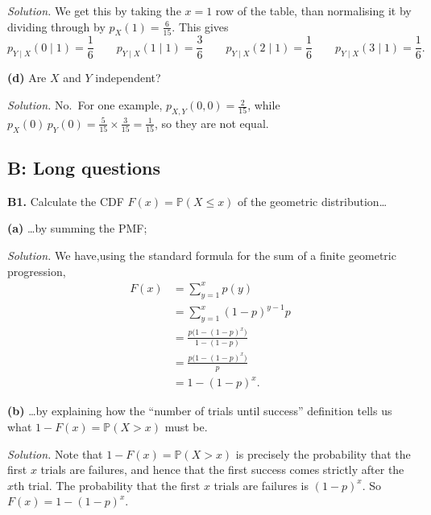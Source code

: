 \documentclass[
  a4paper,
]{book}
\theoremstyle{definition}
\theoremstyle{definition}
\theoremstyle{definition}
\theoremstyle{definition}
\theoremstyle{remark}
\begin{document}
\begin{myanswers}
\emph{Solution.} We get this by taking the \(x = 1\) row of the table, than normalising it by dividing through by \(p_X(1) = \frac{6}{15}\). This gives
\[ p_{Y\mid X} (0 \mid 1) = \frac{1}{6} \qquad p_{Y\mid X} (1 \mid 1) = \frac{3}{6} \qquad p_{Y\mid X} (2 \mid 1) = \frac{1}{6} \qquad p_{Y\mid X} (3 \mid 1) = \frac{1}{6} . \]

\end{myanswers}

\textbf{(d)} Are \(X\) and \(Y\) independent?

\begin{myanswers}
\emph{Solution.} No.~For one example, \(p_{X,Y}(0,0) = \frac{2}{15}\), while \(p_X(0) \, p_Y(0) = \frac{5}{15} \times \frac{3}{15} = \frac{1}{15}\), so they are not equal.

\end{myanswers}

\hypertarget{P4-long-solutions}{%
\subsection*{B: Long questions}\label{P4-long-solutions}}

\textbf{B1.} Calculate the CDF \(F(x) = \mathbb P(X \leq x)\) of the geometric distribution\ldots{}

\textbf{(a)} \ldots by summing the PMF;

\begin{myanswers}
\emph{Solution.}
We have,using the standard formula for the sum of a finite geometric progression,
\begin{align*}
F(x) &= \sum_{y = 1}^x p(y) \\
&= \sum_{y = 1}^x (1-p)^{y-1} p \\
&= \frac{p\big(1 - (1-p)^x\big)}{1 - (1-p)} \\
&= \frac{p\big(1 - (1-p)^x\big)}{p} \\
&= 1 - (1 - p)^x .
\end{align*}

\end{myanswers}

\textbf{(b)} \ldots by explaining how the ``number of trials until success'' definition tells us what \(1 - F(x) = \mathbb P(X > x)\) must be.

\begin{myanswers}
\emph{Solution.}
Note that \(1 - F(x) = \mathbb P(X > x)\) is precisely the probability that the first \(x\) trials are failures, and hence that the first success comes strictly after the \(x\)th trial. The probability that the first \(x\) trials are failures is \((1-p)^x\). So \(F(x) = 1 - (1-p)^x\).

\end{myanswers}
\end{document}
